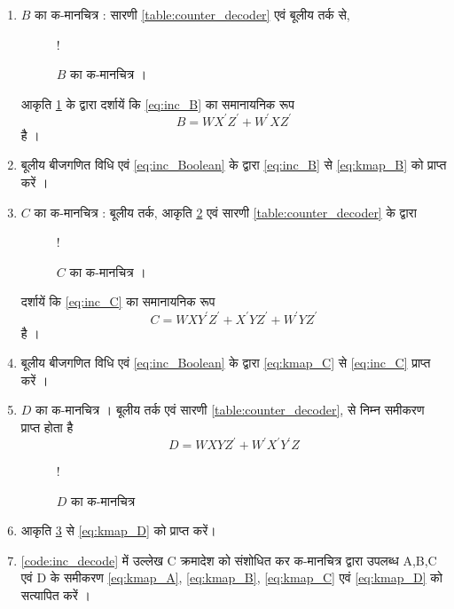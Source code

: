 \begin{enumerate}[label=\thesubsection.\arabic*.,ref=\thesubsection.\theenumi]
\item $B$ का क-मानचित्र :
सारणी \ref{table:counter_decoder} एवं बूलीय तर्क से,
%
\begin{figure}[!h]
\resizebox {\columnwidth} {!} {

}
\caption{$B$ का क-मानचित्र ।}
\label{fig:kmap_B}
\end{figure}
%
आकृति \ref{fig:kmap_B} के द्वारा दर्शायें कि \eqref{eq:inc_B} का समानायनिक रूप
\begin{equation}
\label{eq:kmap_B}
B = WX^{\prime}Z^{\prime} + W^{\prime}XZ^{\prime}
\end{equation}
है ।
\item बूलीय  बीजगणित विधि एवं  \eqref{eq:inc_Boolean} के द्वारा \eqref{eq:inc_B} से  \eqref{eq:kmap_B} को प्राप्त करें ।
%
%
\item {$C$ का क-मानचित्र : }
बूलीय तर्क, आकृति \ref{fig:kmap_C}  एवं  सारणी \ref{table:counter_decoder} के द्वारा
%
%
\begin{figure}[!h]
\resizebox {\columnwidth} {!} {

}
\caption{$C$ का क-मानचित्र । }
\label{fig:kmap_C}
\end{figure}
%
दर्शायें कि  \eqref{eq:inc_C} का समानायनिक रूप 
\begin{equation}
\label{eq:kmap_C}
C = WXY^{\prime}Z^{\prime}  +  X^{\prime}YZ^{\prime} + W^{\prime}YZ^{\prime}
\end{equation}
है ।
%
\item 
बूलीय  बीजगणित विधि एवं \eqref{eq:inc_Boolean} के द्वारा  \eqref{eq:kmap_C} से \eqref{eq:inc_C} प्राप्त करें ।
%
\item {$D$ का क-मानचित्र ।}
बूलीय  तर्क एवं  सारणी \ref{table:counter_decoder}, से निम्न समीकरण प्राप्त होता है
\begin{equation}
\label{eq:kmap_D}
D = WXYZ^{\prime} + W^{\prime}X^{\prime}Y^{\prime}Z
\end{equation}
%
\begin{figure}[!h]
\resizebox {\columnwidth} {!} {

}
\caption{$D$ का क-मानचित्र }
\label{fig:kmap_D}
\end{figure}
%
\item 
आकृति \ref{fig:kmap_D}  से  \eqref{eq:kmap_D} को प्राप्त करें।
%
\item \ref{code:inc_decode} में उल्लेख C क्रमादेश को संशोधित कर  
%
क-मानचित्र द्वारा उपलब्ध  A,B,C एवं D के समीकरण \eqref{eq:kmap_A}, \eqref{eq:kmap_B}, \eqref{eq:kmap_C}
एवं \eqref{eq:kmap_D} को सत्यापित करें ।
%
\end{enumerate}
%
%
